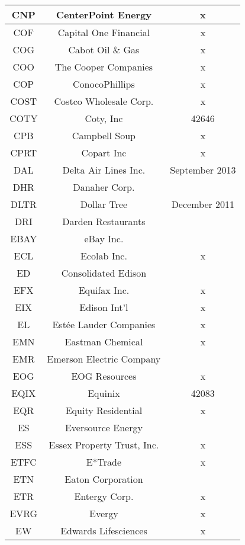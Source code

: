 \documentclass[11pt]{article}
\begin{document}
\begin{onehalfspace}
\begin{longtable}[h!]{|c|c|c|}
        CNP & CenterPoint Energy & x \\ \hline
        COF & Capital One Financial & x \\ \hline
        COG & Cabot Oil \& Gas & x \\ \hline
        COO & The Cooper Companies & x \\ \hline
        COP & ConocoPhillips & x \\ \hline
        COST & Costco Wholesale Corp. & x \\ \hline
        COTY & Coty, Inc & 42646 \\ \hline
        CPB & Campbell Soup & x \\ \hline
        CPRT & Copart Inc & x \\ \hline
        DAL & Delta Air Lines Inc. & September 2013 \\ \hline
        DHR & Danaher Corp. &  \\ \hline
        DLTR & Dollar Tree & December 2011 \\ \hline
        DRI & Darden Restaurants &  \\ \hline
        EBAY & eBay Inc. &  \\ \hline
        ECL & Ecolab Inc. & x \\ \hline
        ED & Consolidated Edison &  \\ \hline
        EFX & Equifax Inc. & x \\ \hline
        EIX & Edison Int'l & x \\ \hline
        EL & Estée Lauder Companies & x \\ \hline
        EMN & Eastman Chemical & x \\ \hline
        EMR & Emerson Electric Company &  \\ \hline
        EOG & EOG Resources & x \\ \hline
        EQIX & Equinix & 42083 \\ \hline
        EQR & Equity Residential & x \\ \hline
        ES & Eversource Energy &  \\ \hline
        ESS & Essex Property Trust, Inc. & x \\ \hline
        ETFC & E*Trade & x \\ \hline
        ETN & Eaton Corporation &  \\ \hline
        ETR & Entergy Corp. & x \\ \hline
        EVRG & Evergy & x \\ \hline
        EW & Edwards Lifesciences & x \\ \hline

\end{longtable}
\end{onehalfspace}
\end{document}
